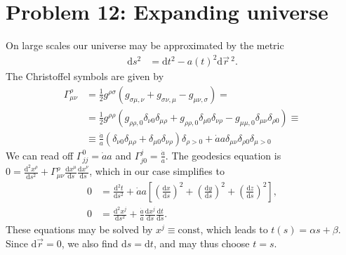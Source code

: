 \documentclass[english, parskip=full]{scrartcl}
\title{\titel}
\author{\autor}
\date{\today}
\newcommand{\kla}{}
\newcommand{\klam}{}
\newcommand{\tecxt}{}
\begin{document}
\maketitle  %


\section*{Problem 12: Expanding universe}
On large scales our universe may be approximated by the metric
\begin{align}
\tecxt\text{d}s^2 &= \tecxt\text{d}t^2 - a(t)^2\tecxt\text{d}\vec{r}\,^2.
\end{align}
The Christoffel symbols are given by
\begin{align}
\Gamma^\rho_{\mu\nu} &= \frac{1}{2}g^{\rho\sigma}\kla\left( g_{\sigma\mu,\nu} + g_{\sigma\nu,\mu} - g_{\mu\nu,\sigma} \right) = \\
&= \frac{1}{2} g^{\rho\rho} \kla\left( g_{\rho\rho,0} \delta_{\nu0} \delta_{\mu\rho} + g_{\rho\rho,0}\delta_{\mu0} \delta_{\nu\rho} - g_{\mu\mu,0} \delta_{\mu\nu}\delta_{\rho0} \right) \equiv \\
&\equiv \frac{\dot{a}}{a} \kla\left( \delta_{\nu0}\delta_{\mu \rho} + \delta_{\mu0}\delta_{\nu \rho} \right) \delta_{\rho > 0} + \dot{a}a \delta_{\mu\nu} \delta_{\rho0} \delta_{\mu > 0}
\end{align}
We can read off $\Gamma^0_{jj} = \dot{a}a$ and $\Gamma^j_{j0} = \frac{\dot{a}}{a}$.
The geodesics equation is $0 = \frac{\tecxt\text{d}^2x^\rho}{\tecxt\text{d}s^2} + \Gamma^\rho_{\mu\nu} \frac{\tecxt\text{d}x^\mu }{\tecxt\text{d}s} \frac{\tecxt\text{d}x^\nu }{\tecxt\text{d}s}$, which in our case simplifies to
\begin{align}
0 &= \frac{\tecxt\text{d}^2t}{\tecxt\text{d}s^2} + \dot{a}a  \klam\left[ \kla\left( \frac{\tecxt\text{d}x }{\tecxt\text{d}s} \right)^2 + \left( \frac{\tecxt\text{d}y }{\tecxt\text{d}s} \right)^2 + \left( \frac{\tecxt\text{d}z }{\tecxt\text{d}s} \right)^2 \right],\\
0 &= \frac{\tecxt\text{d}^2x^j}{\tecxt\text{d}s^2} + \frac{\dot{a}}{a} \frac{\tecxt\text{d}x^j }{\tecxt\text{d}s}  \frac{\tecxt\text{d}t }{\tecxt\text{d}s}.
\end{align}
These equations may be solved by $x^j \equiv \tecxt\text{const}$, which leads to $t(s) = \alpha s + \beta$.
Since $\tecxt\text{d}\vec{r} = 0$, we also find $\tecxt\text{d}s = \tecxt\text{d}t$, and may thus choose $t=s$.
\end{document}
